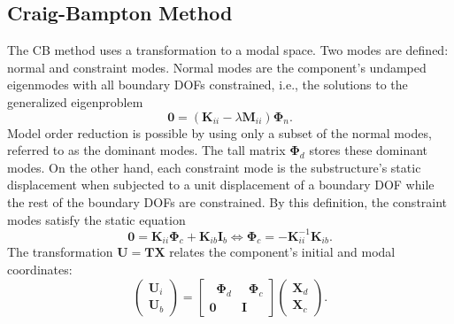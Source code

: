 %
%

\subsection{Craig-Bampton Method}
\label{ssec: CB method}

The CB method uses a transformation to a modal space.
Two modes are defined: normal and constraint modes.
{Normal modes are the component's undamped eigenmodes with all boundary DOFs constrained, i.e., the solutions to the generalized eigenproblem}%
\begin{equation}
    \mathbf{0}
    =
    \left(\mathbf{K}_{ii}-\lambda\mathbf{M}_{ii}\right)\mathbf{\Phi}_{n}.
\end{equation}
Model order reduction is possible by using only a subset of the normal modes, referred to as the dominant modes. 
The tall matrix $\mathbf{\Phi}_{d}$ stores these dominant modes.
On the other hand, each constraint mode is the substructure's static displacement when subjected to a unit displacement of a boundary DOF while the rest of the boundary DOFs are constrained.
{By this definition, the constraint modes satisfy the static equation}%
\begin{equation}
    \mathbf{0}
    =
    \mathbf{K}_{ii} \mathbf{\Phi}_{c} +
    \mathbf{K}_{ib} \mathbf{I}_{b}
    \iff
    \mathbf{\Phi}_{c}
    =
    -\mathbf{K}_{ii}^{-1}\mathbf{K}_{ib}.
\end{equation}
{The transformation $\mathbf{U}=\mathbf{T}\mathbf{X}$ relates the component's initial and modal coordinates:}%
\begin{equation}
    \begin{pmatrix}
        \mathbf{U}_{i} \\
        \mathbf{U}_{b}
    \end{pmatrix}
    =
    \begin{bmatrix}
        \;\;\mathbf{\Phi}_{d} & \;\;\mathbf{\Phi}_{c} \\
        \mathbf{0} & \mathbf{I}
    \end{bmatrix}
    \begin{pmatrix}
        \mathbf{X}_{d} \\
        \mathbf{X}_{c}
    \end{pmatrix}.
    \label{cb_transformation}
\end{equation}
